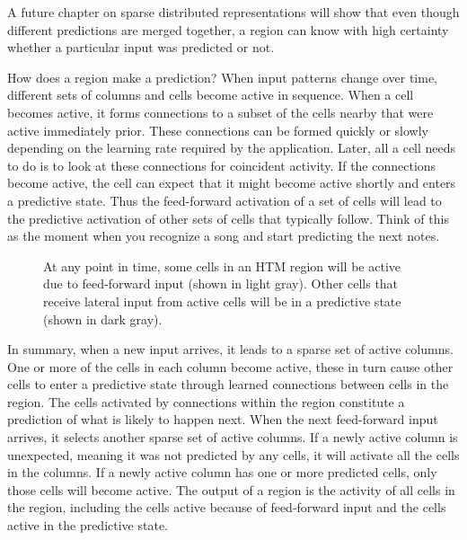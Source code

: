 \documentclass{report}
\begin{document}
\begin{enumerate}
A future chapter on sparse distributed representations will show that
even though different predictions are merged together, a region can
know with high certainty whether a particular input was predicted or
not.

How does a region make a prediction? When input patterns change over
time, different sets of columns and cells become active in
sequence. When a cell becomes active, it forms connections to a subset
of the cells nearby that were active immediately prior. These
connections can be formed quickly or slowly depending on the learning
rate required by the application. Later, all a cell needs to do is to
look at these connections for coincident activity. If the connections
become active, the cell can expect that it might become active shortly
and enters a predictive state. Thus the feed-forward activation of a
set of cells will lead to the predictive activation of other sets of
cells that typically follow. Think of this as the moment when you
recognize a song and start predicting the next notes.

\begin{figure}
\caption{At any point in time, some cells in an HTM region will be
  active due to feed-forward input (shown in light gray). Other cells
  that receive lateral input from active cells will be in a predictive
  state (shown in dark gray).}
\label{figure:activity-types}
\end{figure}

In summary, when a new input arrives, it leads to a sparse set of
active columns. One or more of the cells in each column become active,
these in turn cause other cells to enter a predictive state through
learned connections between cells in the region. The cells activated
by connections within the region constitute a prediction of what is
likely to happen next. When the next feed-forward input arrives, it
selects another sparse set of active columns. If a newly active column
is unexpected, meaning it was not predicted by any cells, it will
activate all the cells in the columns. If a newly active column has
one or more predicted cells, only those cells will become active. The
output of a region is the activity of all cells in the region,
including the cells active because of feed-forward input and the cells
active in the predictive state.


\end{enumerate}
\end{document}
